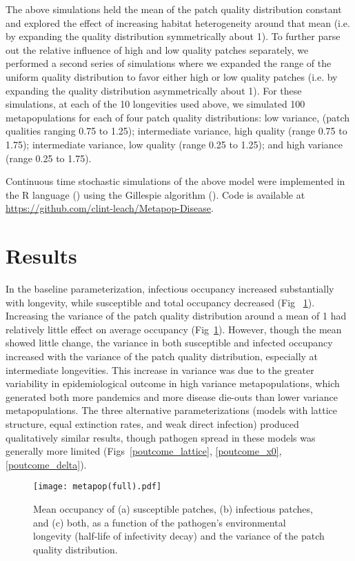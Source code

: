 \documentclass{svjour3}
\begin{document}
The above simulations held the mean of the patch quality distribution constant and explored the effect of increasing habitat heterogeneity around that mean (i.e. by expanding the quality distribution symmetrically about 1).  To further parse out the relative influence of high and low quality patches separately, we performed a second series of simulations where we expanded the range of the uniform quality distribution to favor either high or low quality patches (i.e. by expanding the quality distribution asymmetrically about 1).  For these simulations, at each of the 10 longevities used above, we simulated 100 metapopulations for each of four patch quality distributions: low variance, (patch qualities ranging 0.75 to 1.25); intermediate variance, high quality (range 0.75 to 1.75); intermediate variance, low quality (range 0.25 to 1.25); and high variance (range 0.25 to 1.75). 

Continuous time stochastic simulations of the above model were implemented in the R language (\cite{R2014}) using the Gillespie algorithm (\cite{Gillespie1977}).  Code is available at \url{https://github.com/clint-leach/Metapop-Disease}.

\section{Results}
\label{results}

In the baseline parameterization, infectious occupancy increased substantially with longevity, while susceptible and total occupancy decreased (Fig~ \ref{poutcome}).  Increasing the variance of the patch quality distribution around a mean of 1 had relatively little effect on average occupancy (Fig~\ref{poutcome}).  However, though the mean showed little change, the variance in both susceptible and infected occupancy increased with the variance of the patch quality distribution, especially at intermediate longevities.  This increase in variance was due to the greater variability in epidemiological outcome in high variance metapopulations, which generated both more pandemics and more disease die-outs than lower variance metapopulations.  The three alternative parameterizations (models with lattice structure, equal extinction rates, and weak direct infection) produced qualitatively similar results, though pathogen spread in these models was generally more limited (Figs~\ref{poutcome_lattice}, \ref{poutcome_x0}, \ref{poutcome_delta}).

\begin{figure}
\centering
\texttt{[image: metapop(full).pdf]}
\caption{Mean occupancy of (a) susceptible patches, (b) infectious patches, and (c) both, as a function of the pathogen's environmental longevity (half-life of infectivity decay) and the variance of the patch quality distribution.}
\label{poutcome}
\end{figure}   
\end{document}
